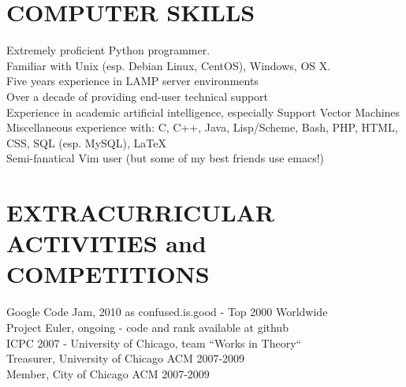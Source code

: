 \documentclass{res}
\begin{document}
\begin{resume}
\section{COMPUTER SKILLS}          
    Extremely proficient Python programmer. \\
    Familiar with Unix (esp. Debian Linux, CentOS), Windows, OS X.\\
    Five years experience in LAMP server environments\\
    Over a decade of providing end-user technical support \\
    Experience in academic artificial intelligence, especially Support Vector Machines \\
    Miscellaneous experience with: C, C++, Java, Lisp/Scheme, Bash, PHP, HTML, CSS, SQL (esp. MySQL), \LaTeX \\
    Semi-fanatical Vim user (but some of my best friends use emacs!)

 
\section{EXTRACURRICULAR ACTIVITIES and COMPETITIONS}
    Google Code Jam, 2010 as confused.is.good - Top 2000 Worldwide \\
    Project Euler, ongoing - code and rank available at github \\
    ICPC 2007 - University of Chicago, team ``Works in Theory`` \\
    Treasurer, University of Chicago ACM 2007-2009 \\         
    Member, City of Chicago ACM 2007-2009
 
\end{resume}
\end{document}
